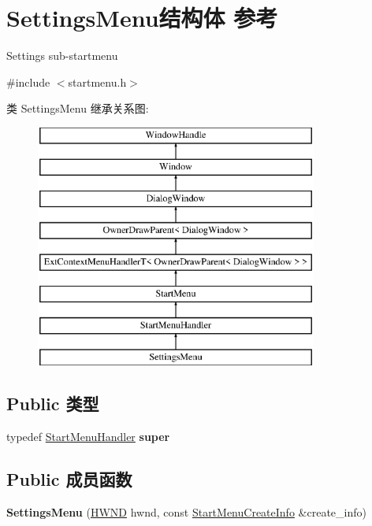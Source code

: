 \hypertarget{struct_settings_menu}{}\section{Settings\+Menu结构体 参考}
\label{struct_settings_menu}


Settings sub-\/startmenu  




{\ttfamily \#include $<$startmenu.\+h$>$}

类 Settings\+Menu 继承关系图\+:\begin{figure}[H]
\begin{center}
\leavevmode
\includegraphics[height=8.000000cm]{struct_settings_menu}
\end{center}
\end{figure}
\subsection*{Public 类型}
\begin{DoxyCompactItemize}
\item 
\mbox{\label{struct_settings_menu_ab2c78c3e87b9334a933c3c1bdf7267c9}} 
typedef \hyperlink{struct_start_menu_handler}{Start\+Menu\+Handler} {\bfseries super}
\end{DoxyCompactItemize}
\subsection*{Public 成员函数}
\begin{DoxyCompactItemize}
\item 
\mbox{\label{struct_settings_menu_aa14dee069add018e1af17feb524955aa}} 
{\bfseries Settings\+Menu} (\hyperlink{interfacevoid}{H\+W\+ND} hwnd, const \hyperlink{struct_start_menu_create_info}{Start\+Menu\+Create\+Info} \&create\+\_\+info)
\end{DoxyCompactItemize}
